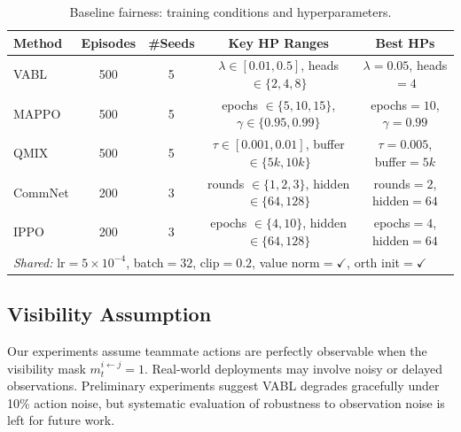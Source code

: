 \documentclass{article}
\theoremstyle{plain}
\theoremstyle{definition}
\theoremstyle{remark}
\begin{document}
\begin{table}[h]
\centering
\caption{Baseline fairness: training conditions and hyperparameters.}
\begin{tabular}{lcccc}
\toprule
\textbf{Method} & \textbf{Episodes} & \textbf{\#Seeds} & \textbf{Key HP Ranges} & \textbf{Best HPs} \\
\midrule
VABL & 500 & 5 & $\lambda \in [0.01, 0.5]$, heads $\in \{2,4,8\}$ & $\lambda=0.05$, heads$=4$ \\
MAPPO & 500 & 5 & epochs $\in \{5,10,15\}$, $\gamma \in \{0.95,0.99\}$ & epochs$=10$, $\gamma=0.99$ \\
QMIX & 500 & 5 & $\tau \in [0.001, 0.01]$, buffer $\in \{5k,10k\}$ & $\tau=0.005$, buffer$=5k$ \\
CommNet & 200 & 3 & rounds $\in \{1,2,3\}$, hidden $\in \{64,128\}$ & rounds$=2$, hidden$=64$ \\
IPPO & 200 & 3 & epochs $\in \{4,10\}$, hidden $\in \{64,128\}$ & epochs$=4$, hidden$=64$ \\
\midrule
\multicolumn{5}{l}{\footnotesize \textit{Shared:} lr$=5\times10^{-4}$, batch$=32$, clip$=0.2$, value norm$=\checkmark$, orth init$=\checkmark$} \\
\bottomrule
\end{tabular}
\end{table}

\subsection{Visibility Assumption}
\label{app:visibility}

Our experiments assume teammate actions are perfectly observable when the visibility mask $m_t^{i \leftarrow j} = 1$. Real-world deployments may involve noisy or delayed observations. Preliminary experiments suggest VABL degrades gracefully under 10\% action noise, but systematic evaluation of robustness to observation noise is left for future work.
\end{document}
